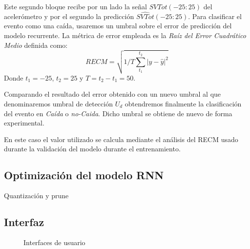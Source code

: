 \documentclass[../tfm.tex]{subfiles}
\begin{document}
Este segundo bloque recibe por un lado la señal $SVTot(-25:25)$ del acelerómetro y por el segundo la predicción $\hat{SVTot}(-25:25)$. Para clasificar el evento como una caída, usaremos un umbral sobre el error de predicción del modelo recurrente. La métrica de error empleada es la \textit{Raíz del Error Cuadrático Medio} definida como: \[
RECM=\sqrt{1/T\sum_{t_1}^{t_2}|y-\hat{y}|^2 }
\]Donde $t_1 = -25$, $t_2 = 25$ y $T=t_2-t_1=50$.

Comparando el resultado del error obtenido con un nuevo umbral al que denominaremos umbral de detección $U_{d}$ obtendremos finalmente la clasificación del evento en \textit{Caída} o \textit{no-Caida}. Dicho umbral se obtiene de nuevo de forma experimental.

En este caso el valor utilizado se calcula mediante el análisis del RECM usado durante la validación del modelo durante el entrenamiento.


\subsection{Optimización del modelo RNN}

Quantización y prune


\subsection{Interfaz}


\begin{figure}[!ht]
  \centering
  \iffalse
  \begin{subfigure}[b]{}
      \centering
      \texttt{[image: appActivity.png]}
      \caption{Aplicación de gestión}
      \label{fig:uiActivity}
  \end{subfigure}
  \hfill
  \begin{subfigure}[b]{}
      \centering
      \texttt{[image: appWatchface.png]}
      \caption{\textit{Watchface}}
      \label{fig:uiWatchface}
  \end{subfigure}
\fi
{}
     \caption{\label{fig:uiApps} Interfaces de usuario}
     \hfill
{}

\end{figure}
\end{document}

